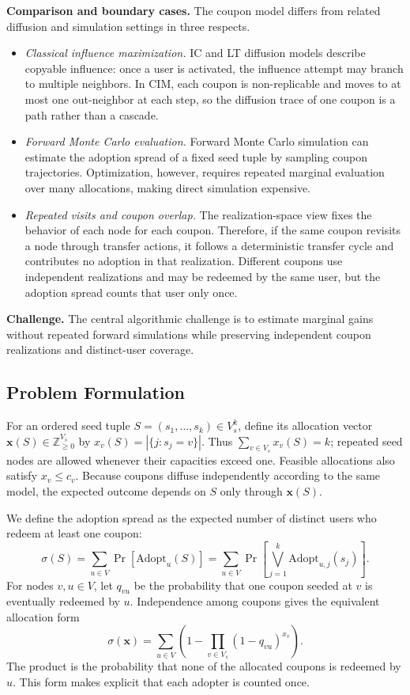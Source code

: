 \documentclass[sigconf,balance=false]{acmart}
\begin{document}
\textbf{Comparison and boundary cases.}
The coupon model differs from related diffusion and simulation settings
in three respects.
\begin{itemize}
  \item \emph{Classical influence maximization.}
  IC and LT diffusion models describe copyable influence: once a user is
  activated, the influence attempt may branch to multiple neighbors.
  In CIM, each coupon is non-replicable and moves to at most one
  out-neighbor at each step, so the diffusion trace of one coupon is a
  path rather than a cascade.

  \item \emph{Forward Monte Carlo evaluation.}
  Forward Monte Carlo simulation can estimate the adoption spread of a
  fixed seed tuple by sampling coupon trajectories.
  Optimization, however, requires repeated marginal evaluation over many
  allocations, making direct simulation expensive.

  \item \emph{Repeated visits and coupon overlap.}
  The realization-space view fixes the behavior of each node for each
  coupon.
  Therefore, if the same coupon revisits a node through transfer actions,
  it follows a deterministic transfer cycle and contributes no adoption
  in that realization.
  Different coupons use independent realizations and may be redeemed by
  the same user, but the adoption spread counts that user only once.
\end{itemize}

\textbf{Challenge.}
The central algorithmic challenge is to estimate marginal gains without
repeated forward simulations while preserving independent coupon
realizations and distinct-user coverage.

\subsection{Problem Formulation}

For an ordered seed tuple $S=(s_1,\ldots,s_k)\in V_s^k$, define its
allocation vector $\bm{x}(S)\in\mathbb{Z}_{\geq 0}^{V_s}$ by
$x_v(S)=|\{j:s_j=v\}|$.
Thus $\sum_{v\in V_s}x_v(S)=k$; repeated seed nodes are allowed whenever
their capacities exceed one.
Feasible allocations also satisfy $x_v\leq c_v$.
Because coupons diffuse independently according to the same model, the
expected outcome depends on $S$ only through $\bm{x}(S)$.

We define the adoption spread as the expected number of distinct users who
redeem at least one coupon:
\[
  \sigma(S) = \sum_{u \in V}
    \Pr\!\left[\mathrm{Adopt}_u(S)\right]
  = \sum_{u \in V}
    \Pr\!\left[\bigvee_{j=1}^{k} \mathrm{Adopt}_{u,j}(s_j)\right].
\]
For nodes $v,u\in V$, let $q_{vu}$ be the probability that one coupon
seeded at $v$ is eventually redeemed by $u$.
Independence among coupons gives the equivalent allocation form
\[
  \sigma(\bm{x})=
  \sum_{u\in V}\left(1-\prod_{v\in V_s}(1-q_{vu})^{x_v}\right).
\]
The product is the probability that none of the allocated coupons is redeemed
by $u$.
This form makes explicit that each adopter is counted once.
\end{document}
